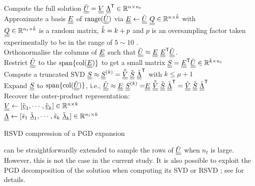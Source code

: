 \begin{algorithm}[hbt!]
	\vspace{0.2cm}
	\vspace{0.2cm}

	Compute the full solution $\z{\mU} = \mV \ \T{\mLambda} \in \ffR^{n\times n_t}$\\
	Approximate a basis $\underline{\underline{E}}$ of $\mathrm{range}({\tilde{\underline{\underline{U}}}})$ via $\underline{\underline{E}} \leftarrow {\tilde{\underline{\underline{U}}}} \ \underline{\underline{Q}} \in {\mathbb{ R}}^{n\times{\tilde{k}}}$ with\\
	\qquad $\underline{\underline{Q}} \in {\mathbb{ R}}^{n_t\times{\tilde{k}}}$ is a random matrix, ${\tilde{k}}=k+p$ and $p$ is an oversampling factor taken\\ \qquad experimentally to be in the range of $5\sim10$ \parencite{halko2011finding}.\\
	Orthonormalise the columns of $\underline{\underline{E}}$ such that ${\tilde{\underline{\underline{U}}}} \approx \underline{\underline{E}} \ {\underline{\underline{E}}}^{\sf T} {\tilde{\underline{\underline{U}}}}$.\\
	Restrict ${\tilde{\underline{\underline{U}}}}$ to the $\mathrm{span\{col(} \underline{\underline{E}})\}$ to get a small matrix ${\underline{\underline{S}}={\underline{\underline{E}}}^{\sf T} {\tilde{\underline{\underline{U}}}} } \in {\mathbb{ R}}^{{\tilde{k}}\times n_t}$\\
	Compute a truncated SVD ${\underline{\underline{S}} \approx \underline{\underline{S}}^{(k)} = {{\tilde{{\tilde{\underline{\underline{V}}}}}}} \ {\tilde{\underline{\underline{S}}}} \ {{\tilde{\underline{\underline{\Lambda}}}}}^{\sf T}}$ with ${k\leq\mu+1}$\\
	Expand $\underline{\underline{S}}$ to $\mathrm{span\{col(} {\tilde{\underline{\underline{U}}}})\}$, i.e., ${\z{\mU} \approx \mE \ {\mS^{(k)} = }  \mE \ {\z{\z{\mV}}} \ \z\mS \ \T{\z\mLambda} = \z{\mV} \ \z\mS \ \T{\z\mLambda}}$\\
	Recover the outer-product representation:\\
	\qquad $\underline{\underline{V}} \leftarrow [{\tilde{\underline{v}}}_1,\cdots,{\tilde{\underline{v}}}_{k}] \in {\mathbb{ R}}^{n\times k} $\\[0.1cm]
	\qquad $\mLambda \leftarrow [\z{s}_1\ \z\vlambda_1,\cdots,\z{s}_k\ \z\vlambda_{k}] \in \ffR^{n_t \times k} $

	\caption{RSVD compression of a PGD expansion}
	\label{alg:randomised_svd}
\end{algorithm}

 can be straightforwardly extended to sample the rows of ${\tilde{\underline{\underline{U}}}}$ when $n_t$ is large. However, this is not the case in the current study. It is also possible to exploit the PGD decomposition of the solution when computing its SVD or RSVD \parencite{Bebendorf2008}; see  for details.

